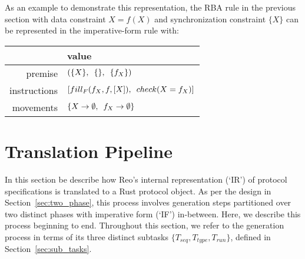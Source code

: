 As an example to demonstrate this representation, the RBA rule in the previous section with data constraint $X=f(X)$
and synchronization constraint $\{X\}$ can be represented in the imperative-form rule with:

\vspace{1em}
\noindent{}
\begin{tabular}{r|l}
	\centering
		&  value \\ \hline
	premise	&  $(\{X\}, \enskip\{\}, \enskip\{f_X\})$ \\
	instructions	& $[fill_F(f_X, f, [X]), \enskip{} check(X = f_X)]$ \\
	movements	& $\{X \rightarrow{}\emptyset{}, \enskip f_X \rightarrow{}\emptyset{}\}$ 
\end{tabular}
\vspace{1em}

\section{Translation Pipeline}
In this section be describe how Reo's internal representation (`IR') of protocol specifications is translated to a Rust protocol object. As per the design in Section~\ref{sec:two_phase}, this process involves generation steps partitioned over two distinct phases with imperative form (`IF') in-between. Here, we describe this process beginning to end. Throughout this section, we refer to the generation process in terms of its three distinct subtasks $\{T_{seq}, T_{type}, T_{run}\}$, defined in Section~\ref{sec:sub_tasks}.

